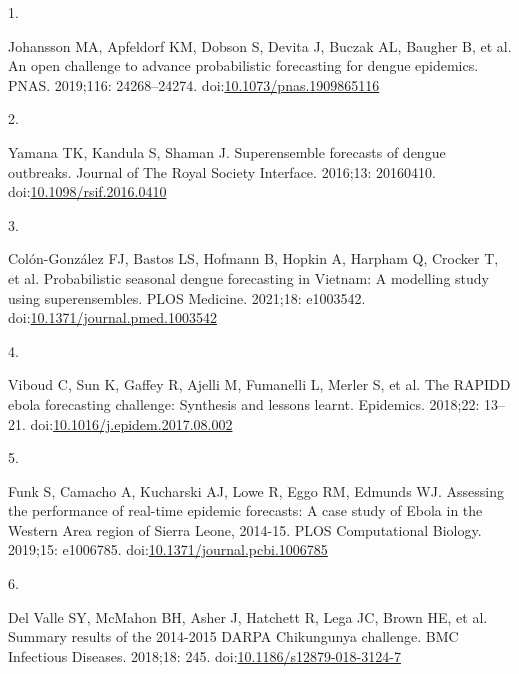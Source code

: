 \documentclass[10pt,letterpaper]{article}
\newlength{\cslhangindent}
\newlength{\csllabelwidth}
\newlength{\cslentryspacingunit} %
\newenvironment{CSLReferences}[2] %
 {%
  \setlength{\parindent}{0pt}
  \ifodd #1
  \let\oldpar\par
  \def\par{\hangindent=\cslhangindent\oldpar}
  \fi
  \setlength{\parskip}{#2\cslentryspacingunit}
 }%
 {}
\newcommand{\CSLLeftMargin}[1]{\parbox[t]{\csllabelwidth}{#1}}
\newcommand{\CSLRightInline}[1]{\parbox[t]{\linewidth - \csllabelwidth}{#1}\break}
\begin{document}
\hypertarget{refs}{}
\begin{CSLReferences}{0}{0}
\leavevmode{}%
\CSLLeftMargin{1. }%
\CSLRightInline{Johansson MA, Apfeldorf KM, Dobson S, Devita J, Buczak
AL, Baugher B, et al. An open challenge to advance probabilistic
forecasting for dengue epidemics. PNAS. 2019;116: 24268--24274.
doi:\href{https://doi.org/10.1073/pnas.1909865116}{10.1073/pnas.1909865116}}

\leavevmode{}%
\CSLLeftMargin{2. }%
\CSLRightInline{Yamana TK, Kandula S, Shaman J. Superensemble forecasts
of dengue outbreaks. Journal of The Royal Society Interface. 2016;13:
20160410.
doi:\href{https://doi.org/10.1098/rsif.2016.0410}{10.1098/rsif.2016.0410}}

\leavevmode{}%
\CSLLeftMargin{3. }%
\CSLRightInline{Colón-González FJ, Bastos LS, Hofmann B, Hopkin A,
Harpham Q, Crocker T, et al. Probabilistic seasonal dengue forecasting
in {Vietnam}: {A} modelling study using superensembles. PLOS Medicine.
2021;18: e1003542.
doi:\href{https://doi.org/10.1371/journal.pmed.1003542}{10.1371/journal.pmed.1003542}}

\leavevmode{}%
\CSLLeftMargin{4. }%
\CSLRightInline{Viboud C, Sun K, Gaffey R, Ajelli M, Fumanelli L, Merler
S, et al. The {RAPIDD} ebola forecasting challenge: {Synthesis} and
lessons learnt. Epidemics. 2018;22: 13--21.
doi:\href{https://doi.org/10.1016/j.epidem.2017.08.002}{10.1016/j.epidem.2017.08.002}}

\leavevmode{}%
\CSLLeftMargin{5. }%
\CSLRightInline{Funk S, Camacho A, Kucharski AJ, Lowe R, Eggo RM,
Edmunds WJ. Assessing the performance of real-time epidemic forecasts:
{A} case study of {Ebola} in the {Western Area} region of {Sierra
Leone}, 2014-15. PLOS Computational Biology. 2019;15: e1006785.
doi:\href{https://doi.org/10.1371/journal.pcbi.1006785}{10.1371/journal.pcbi.1006785}}

\leavevmode{}%
\CSLLeftMargin{6. }%
\CSLRightInline{Del Valle SY, McMahon BH, Asher J, Hatchett R, Lega JC,
Brown HE, et al. Summary results of the 2014-2015 {DARPA Chikungunya}
challenge. BMC Infectious Diseases. 2018;18: 245.
doi:\href{https://doi.org/10.1186/s12879-018-3124-7}{10.1186/s12879-018-3124-7}}


\end{CSLReferences}
\end{document}
